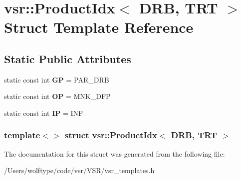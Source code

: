 \hypertarget{structvsr_1_1_product_idx_3_01_d_r_b_00_01_t_r_t_01_4}{\section{vsr\-:\-:Product\-Idx$<$ D\-R\-B, T\-R\-T $>$ Struct Template Reference}
\label{structvsr_1_1_product_idx_3_01_d_r_b_00_01_t_r_t_01_4}
}
\subsection*{Static Public Attributes}
\begin{DoxyCompactItemize}
\item 
\hypertarget{structvsr_1_1_product_idx_3_01_d_r_b_00_01_t_r_t_01_4_ac56f74d225a624d7b77986734d420758}{static const int {\bfseries G\-P} = P\-A\-R\-\_\-\-D\-R\-B}\label{structvsr_1_1_product_idx_3_01_d_r_b_00_01_t_r_t_01_4_ac56f74d225a624d7b77986734d420758}

\item 
\hypertarget{structvsr_1_1_product_idx_3_01_d_r_b_00_01_t_r_t_01_4_a64af01e599d6269e39fd3020f2d5008a}{static const int {\bfseries O\-P} = M\-N\-K\-\_\-\-D\-F\-P}\label{structvsr_1_1_product_idx_3_01_d_r_b_00_01_t_r_t_01_4_a64af01e599d6269e39fd3020f2d5008a}

\item 
\hypertarget{structvsr_1_1_product_idx_3_01_d_r_b_00_01_t_r_t_01_4_a68538bcf332133f00020c4b2f4bd89f9}{static const int {\bfseries I\-P} = I\-N\-F}\label{structvsr_1_1_product_idx_3_01_d_r_b_00_01_t_r_t_01_4_a68538bcf332133f00020c4b2f4bd89f9}

\end{DoxyCompactItemize}
\subsubsection*{template$<$$>$ struct vsr\-::\-Product\-Idx$<$ D\-R\-B, T\-R\-T $>$}



The documentation for this struct was generated from the following file\-:\begin{DoxyCompactItemize}
\item 
/\-Users/wolftype/code/vsr/\-V\-S\-R/vsr\-\_\-templates.\-h\end{DoxyCompactItemize}
